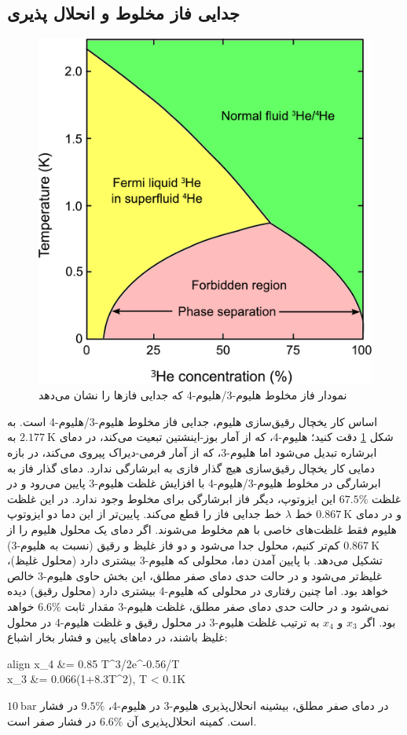 \documentclass[12pt,a4paper]{article}
\begin{document}
	\subsection{جدایی فاز مخلوط و انحلال پذیری}
	\begin{figure}
		\centering
		\includegraphics[width=0.75\linewidth]{phase}
		\caption{نمودار فاز مخلوط هلیوم-3/هلیوم-4 که جدایی فازها را نشان می‌دهد}
		\label{fig3}
	\end{figure}
	اساس کار یخچال رقیق‌سازی هلیوم، جدایی فاز مخلوط هلیوم-3/هلیوم-4 است. به شکل \ref{fig3} دقت کنید؛ هلیوم-4، که از آمار بوز-اینشتین تبعیت می‌کند،
	در دمای $\SI{2.177}{\kelvin}$ به ابرشاره تبدیل می‌شود اما هلیوم-3، که از آمار فرمی-دیراک پیروی می‌کند، در بازه دمایی کار یخچال رقیق‌سازی هیچ گذار فازی به ابرشارگی ندارد.
	دمای گذار فاز به ابرشارگی در مخلوط هلیوم-3/هلیوم-4 با افزایش غلظت هلیوم-3 پایین می‌رود و در غلظت $67.5\%$ این ایزوتوپ، دیگر فاز ابرشارگی برای مخلوط وجود ندارد.
	در این غلظت و در دمای $\SI{0.867}{\kelvin}$ خط $\lambda$ خط جدایی فاز را قطع می‌کند. پایین‌تر از این دما دو ایزوتوپ هلیوم فقط غلظت‌های خاصی با هم مخلوط می‌شوند.
	اگر دمای یک محلول هلیوم را از $\SI{0.867}{\kelvin}$  کم‌تر کنیم، محلول جدا می‌شود و دو فاز غلیظ و رقیق (نسبت به هلیوم-3) تشکیل می‌دهد.
	با پایین آمدن دما، محلولی که هلیوم-3 بیشتری دارد (محلول غلیظ)، غلیظ‌تر می‌شود و در حالت حدی دمای صفر مطلق، این بخش حاوی هلیوم-3 خالص خواهد بود.
	اما چنین رفتاری در محلولی که هلیوم-4 بیشتری دارد (محلول رقیق) دیده نمی‌شود و در حالت حدی دمای صفر مطلق، غلظت هلیوم-3 مقدار ثابت $6.6\%$ خواهد بود.
	اگر $x_3 $ و $x_4 $ به ترتیب غلظت هلیوم-3 در محلول رقیق و غلظت هلیوم-4 در محلول غلیظ باشند، در دماهای پایین و فشار بخار اشباع:
	\begin{empheq}[left=\empheqlbrace]{align}
		x_4 &= 0.85 T^{3/2}e^{-0.56/T} \\
		x_3 &= 0.066(1+8.3T^2), \quad T < 0.1K
	\end{empheq}
	در دمای صفر مطلق، بیشینه انحلال‌پذیری هلیوم-3 در هلیوم-4، $9.5\%$ در فشار $\SI{10}{\bar}$ است. کمینه انحلال‌پذیری آن $6.6\%$ در فشار صفر است.
	
\end{document}
